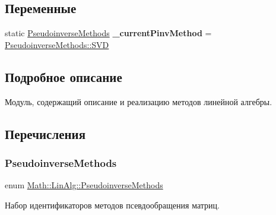 \subsection*{Переменные}
\begin{DoxyCompactItemize}
\item 
\hypertarget{namespace_math_1_1_lin_alg_aca2f89d498128b0693d089277c2be56f}{}\label{namespace_math_1_1_lin_alg_aca2f89d498128b0693d089277c2be56f} 
static \hyperlink{namespace_math_1_1_lin_alg_a34ee452c5d64eeb10e1bb63cf887af17}{Pseudoinverse\+Methods} {\bfseries \+\_\+current\+Pinv\+Method} = \hyperlink{namespace_math_1_1_lin_alg_a34ee452c5d64eeb10e1bb63cf887af17a595e2d2f1a68ede96e96f849a85370bc}{Pseudoinverse\+Methods\+::\+S\+VD}
\end{DoxyCompactItemize}


\subsection{Подробное описание}
Модуль, содержащий описание и реализацию методов линейной алгебры. 

\subsection{Перечисления}
\hypertarget{namespace_math_1_1_lin_alg_a34ee452c5d64eeb10e1bb63cf887af17}{}\label{namespace_math_1_1_lin_alg_a34ee452c5d64eeb10e1bb63cf887af17} 
\subsubsection{\texorpdfstring{Pseudoinverse\+Methods}{PseudoinverseMethods}}
{\footnotesize\ttfamily enum \hyperlink{namespace_math_1_1_lin_alg_a34ee452c5d64eeb10e1bb63cf887af17}{Math\+::\+Lin\+Alg\+::\+Pseudoinverse\+Methods}\hspace{0.3cm}{\ttfamily [strong]}}



Набор идентификаторов методов псевдообращения матриц. 

